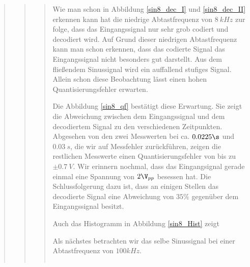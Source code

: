 \begin{quote}
\begin{quote}
\begin{quote}
            Wie man schon in Abbildung \ref{sin8_dec_I} und \ref{sin8_dec_II} erkennen kann hat die niedrige
            Abtastfrequenz von $8 \ kHz$ zur folge, dass das Eingangssignal nur sehr grob codiert und decodiert wird.
            Auf Grund dieser niedrigen Abtastfrequenz kann man schon erkennen, dass das codierte Signal das Eingangssignal
            nicht besonders gut darstellt. Aus dem fließendem Sinussignal wird ein auffallend stufiges Signal.\\
            Allein schon diese Beobachtung lässt einen hohen Quantisierungsfehler erwarten.\vspace{1em}
            
            Die Abbildung \ref{sin8_qf} bestätigt diese Erwartung. Sie zeigt die Abweichung zwischen dem Eingangssignal
            und dem decodiertem Signal zu den verschiedenen Zeitpunkten. Abgesehen von den zwei Messwerten bei ca.
            $0.0225 \s$ und $0.03 \ s$, die wir auf Messfehler zurückführen, zeigen die restlichen Messwerte einen
            Quantisierungsfehler von bis zu $\pm 0.7 \ V$. Wir erinnern nochmal, dass das Eingangsignal gerade einmal
            eine Spannung von $2 \V_{pp}$ besessen hat. Die Schlussfolgerung dazu ist, dass an einigen Stellen das
            decodierte Signal eine Abweichung von $35 \%$ gegenüber dem Eingangssignal besitzt.\vspace{1em}
            
            Auch das Histogramm in Abbildung \ref{sin8_Hist} zeigt 
            
            
    
            \vspace{1em}
            
            Als nächstes betrachten wir das selbe Sinussignal bei einer Abtastfrequenz von $100 kHz$. 
    
            \begin{center}
                \begin{tabular}{ll}
                

\end{tabular}
\end{center}
\end{quote}
\end{quote}
\end{quote}
